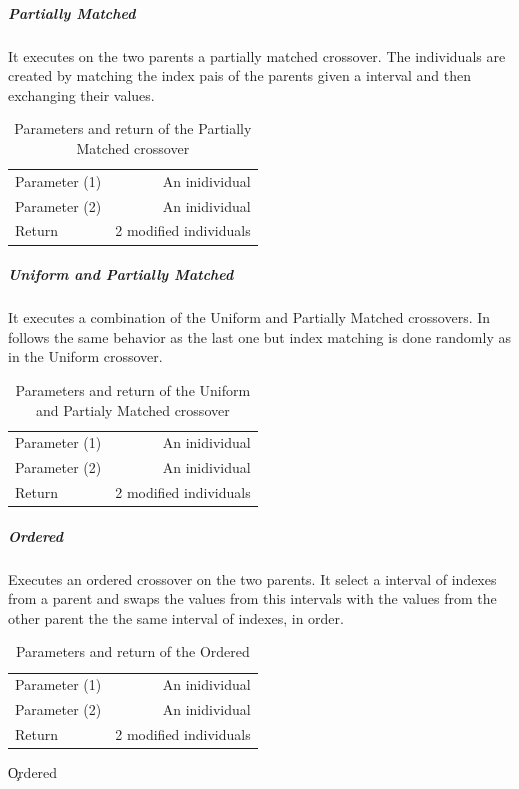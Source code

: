 \subparagraph{Partially Matched}
It executes on the two parents a partially matched crossover. The individuals are created by matching the index pais of the parents given a interval and then exchanging their values.\\

\begin{table}[!h]
  \begin{center}
  \begin{tabular}{|l|r|}
    \hline
    Parameter (1) & An inidividual\\
    Parameter (2) & An inidividual\\
    Return & 2 modified individuals\\
    \hline    
  \end{tabular}
  \end{center}
  \caption{Parameters and return of the  Partially Matched crossover}
  \label{Partially Matched}
\end{table}

\subparagraph{Uniform and Partially Matched}
It executes a combination of the Uniform and Partially Matched crossovers. In follows the same behavior as the last one but index matching is done randomly as in the Uniform crossover.\\

\begin{table}[!h]
  \begin{center}
  \begin{tabular}{|l|r|}
    \hline
    Parameter (1) & An inidividual\\
    Parameter (2) & An inidividual\\
    Return & 2 modified individuals\\
    \hline    
  \end{tabular}
  \end{center}
  \caption{Parameters and return of the Uniform and Partialy Matched crossover}
  \label{Uniform and Partially Matched}
\end{table}

\subparagraph{Ordered}
Executes an ordered crossover on the two parents. It select a interval of indexes from a parent and swaps the values from this intervals with the values from the other parent the the same interval of indexes, in order.\\

\begin{table}[!h]
  \begin{center}
  \begin{tabular}{|l|r|}
    \hline
    Parameter (1) & An inidividual\\
    Parameter (2) & An inidividual\\
    Return & 2 modified individuals\\
    \hline    
  \end{tabular}
  \end{center}
  \caption{Parameters and return of the Ordered}
  \c{Ordered}
\end{table}


